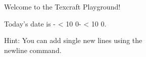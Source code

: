 \def\welcome#1{Welcome to #1!}
\welcome{the Texcraft Playground}

\def\twodigit#1{\ifnum#1 < 10 0\fi\the#1}
Today's date is \the\year-\twodigit\month-\twodigit\day.

Hint:\newline
You can add single new lines using the \\newline command.
